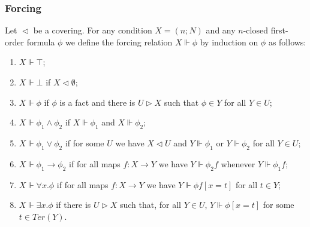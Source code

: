 \documentclass[handout,11pt]{beamer}
\newcommand{\es}{\emptyset}
\newcommand{\covd}{\mathrel{\vartriangleleft}}
\newcommand{\covs}{\mathrel{\vartriangleright}}
\begin{document}
\begin{frame}
\frametitle{Forcing}

Let ${\covd}$ be a covering. %
For any condition $X=(n;N)$ and any $n$-closed first-order formula
$\phi$ we define the forcing relation
$X\Vdash\phi$ by induction on $\phi$ as follows:
\begin{enumerate}
\item $X\Vdash\top$;

\item $X\Vdash\bot$ if $X\covd\es$;

\item $X\Vdash\phi$ if $\phi$ is a fact and there is $U \covs X$ such that
$\phi\in Y$ for all $Y\in U$;

\item $X\Vdash\phi_1 \land \phi_2$ if $X\Vdash\phi_1$ and $X\Vdash\phi_2$;

\item $X\Vdash\phi_1 \lor \phi_2$ if for some $U$ we have
$X\covd U$ and  $Y\Vdash\phi_1$ or $Y\Vdash\phi_2$ for all $Y\in U$;

\item $X\Vdash\phi_1 \to \phi_2$ if for all maps $f:X\to Y$
we have $Y\Vdash\phi_2f$ whenever $Y\Vdash\phi_1f$;

\item $X\Vdash\forall x.\phi$ if for all maps $f:X\to Y$ we have 
 $Y\Vdash\phi f[x=t]$ for all $t\in Y$;
 
\item $X\Vdash\exists x.\phi$ if there is $U\covs X$ such that,
for all $Y\in U$, $Y\Vdash\phi[x=t]$ for some $t\in Ter(Y)$.

\end{enumerate}
\end{frame}
\end{document}
